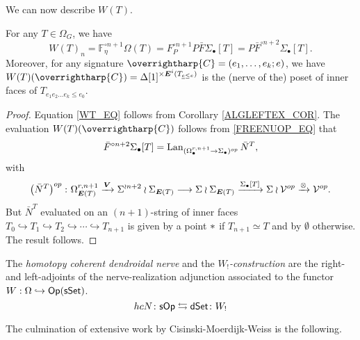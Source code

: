 \documentclass[a4paper,10pt
,draft
]{article}%
\renewcommand{\1}{\eta}%
\newcommand{\vect}[1]{\text{\overrightharp{\ensuremath{#1}}}}
\begin{document}
We can now describe $W(T)$.
\begin{corollary}
      \label{WT_COR}
      For any $T \in \Omega_G$, we have
      \begin{equation}
            \label{WT_EQ}
            W(T)_n = \mathbb F_\eta^{\circ n+1} \Omega(T) = F_P^{\circ n+1} P \bar F \Sigma_\bullet[T] = P \bar F^{\circ n+2}\Sigma_\bullet[T].
      \end{equation}
      Moreover, for any signature $\vect C = (e_1, \dots, e_k; e)$, we have
      $W(T)(\vect C) = \Delta[1]^{\times \boldsymbol{E}^i(T_{\underline{e} \leq e})}$ is the (nerve of the) poset of inner faces of $T_{e_1 e_2 \dots e_k \leq e_0}$.
\end{corollary}
\begin{proof}
      Equation \eqref{WT_EQ} follows from Corollary \ref{ALGLEFTEX_COR}.
      The evaluation $W(T)(\vect C)$ follows from \eqref{FREENUOP_EQ} that
      \[
            \bar F^{\circ n+2} \Sigma_\bullet[T] = \operatorname{Lan}_{(\Omega_\bullet^{r,n+1}\to \Sigma_\bullet)^{op}} \bar N^{T},
      \]
      with
      \[
            \left(\bar N^{T}\right)^{op} \colon
            \Omega_{\boldsymbol E(T)}^{r, n+1} \xrightarrow{\boldsymbol{V}}
            \Sigma^{\wr n+2} \wr \Sigma_{\boldsymbol E(T)} \longrightarrow
            \Sigma \wr \Sigma_{\boldsymbol E(T)} \xrightarrow{\Sigma_\bullet[T]}
            \Sigma \wr \mathcal V^{op} \xrightarrow{\otimes}
            \mathcal V^{op}.
      \]
      But $\bar N^T$ evaluated on an $(n+1)$-string of inner faces
      $T_0 \hookrightarrow T_1 
      \hookrightarrow T_2 
      \hookrightarrow \cdots
      \hookrightarrow T_{n+1}$
      is given by a point $\**$
      if $T_{n+1} \simeq T$
      and by $\emptyset$ otherwise.
      The result follows.
\end{proof}


\begin{definition}
      The \textit{homotopy coherent dendroidal nerve} and the \textit{$W_!$-construction}
      are the right- and left-adjoints of the nerve-realization adjunction associated to the functor $W: \Omega \hookrightarrow \mathsf{Op}(\mathsf{sSet})$.
      \begin{equation}
            \label{SOPDSET_EQ}
            hc N \colon \mathsf{sOp} \leftrightarrows
            \mathsf{dSet} \colon W_!
      \end{equation}
\end{definition}

The culmination of extensive work by Cisinski-Moerdijk-Weiss \cite{CM13a,CM13b,CM11,MW09,MW07} is the following.
\end{document}
